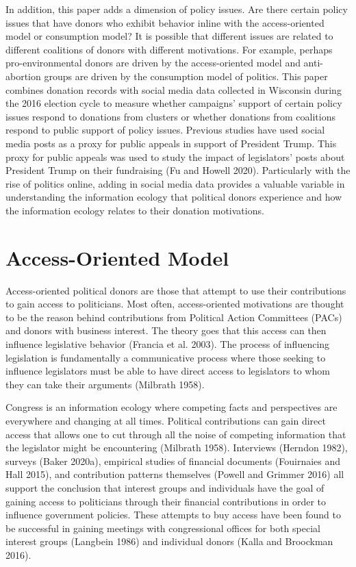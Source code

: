\documentclass[12pt,]{article}
\begin{document}
In addition, this paper adds a dimension of policy issues. Are there
certain policy issues that have donors who exhibit behavior inline with
the access-oriented model or consumption model? It is possible that
different issues are related to different coalitions of donors with
different motivations. For example, perhaps pro-environmental donors are
driven by the access-oriented model and anti-abortion groups are driven
by the consumption model of politics. This paper combines donation
records with social media data collected in Wisconsin during the 2016
election cycle to measure whether campaigns' support of certain policy
issues respond to donations from clusters or whether donations from
coalitions respond to public support of policy issues. Previous studies
have used social media posts as a proxy for public appeals in support of
President Trump. This proxy for public appeals was used to study the
impact of legislators' posts about President Trump on their fundraising
(Fu and Howell 2020). Particularly with the rise of politics online,
adding in social media data provides a valuable variable in
understanding the information ecology that political donors experience
and how the information ecology relates to their donation motivations.

\hypertarget{access-oriented-model}{%
\section{Access-Oriented Model}\label{access-oriented-model}}

Access-oriented political donors are those that attempt to use their
contributions to gain access to politicians. Most often, access-oriented
motivations are thought to be the reason behind contributions from
Political Action Committees (PACs) and donors with business interest.
The theory goes that this access can then influence legislative behavior
(Francia et al. 2003). The process of influencing legislation is
fundamentally a communicative process where those seeking to influence
legislators must be able to have direct access to legislators to whom
they can take their arguments (Milbrath 1958).

Congress is an information ecology where competing facts and
perspectives are everywhere and changing at all times. Political
contributions can gain direct access that allows one to cut through all
the noise of competing information that the legislator might be
encountering (Milbrath 1958). Interviews (Herndon 1982), surveys (Baker
2020a), empirical studies of financial documents (Fouirnaies and Hall
2015), and contribution patterns themselves (Powell and Grimmer 2016)
all support the conclusion that interest groups and individuals have the
goal of gaining access to politicians through their financial
contributions in order to influence government policies. These attempts
to buy access have been found to be successful in gaining meetings with
congressional offices for both special interest groups (Langbein 1986)
and individual donors (Kalla and Broockman 2016).
\end{document}
